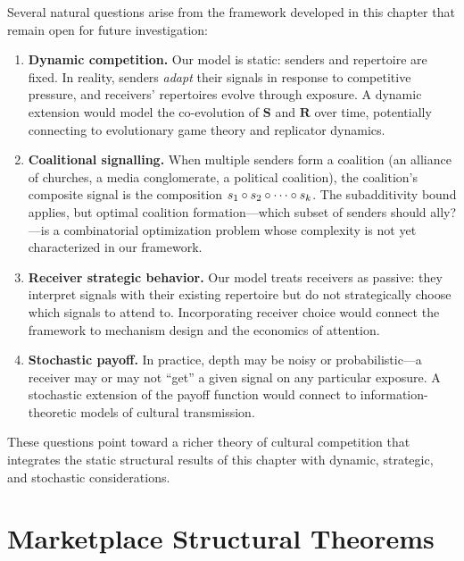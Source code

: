 \begin{remark}
Several natural questions arise from the framework developed in this
chapter that remain open for future investigation:

\begin{enumerate}
\item \textbf{Dynamic competition.}  Our model is static: senders and
  repertoire are fixed.  In reality, senders \emph{adapt} their signals in
  response to competitive pressure, and receivers' repertoires evolve
  through exposure.  A dynamic extension would model the co-evolution of
  $\mathbf{S}$ and $\mathbf{R}$ over time, potentially connecting to
  evolutionary game theory and replicator dynamics.

\item \textbf{Coalitional signalling.}  When multiple senders form a
  coalition (an alliance of churches, a media conglomerate, a political
  coalition), the coalition's composite signal is the composition
  $s_1 \circ s_2 \circ \cdots \circ s_k$.  The subadditivity
  bound applies, but optimal coalition formation---which subset of senders
  should ally?---is a combinatorial optimization problem whose complexity
  is not yet characterized in our framework.

\item \textbf{Receiver strategic behavior.}  Our model treats receivers as
  passive: they interpret signals with their existing repertoire but do not
  strategically choose which signals to attend to.  Incorporating receiver
  choice would connect the framework to mechanism design and the economics
  of attention.

\item \textbf{Stochastic payoff.}  In practice, depth may be noisy or
  probabilistic---a receiver may or may not ``get'' a given signal on any
  particular exposure.  A stochastic extension of the payoff function would
  connect to information-theoretic models of cultural transmission.
\end{enumerate}

These questions point toward a richer theory of cultural competition that
integrates the static structural results of this chapter with dynamic,
strategic, and stochastic considerations.
\end{remark}

\section{Marketplace Structural Theorems}
\label{sec:ch11-structural}

